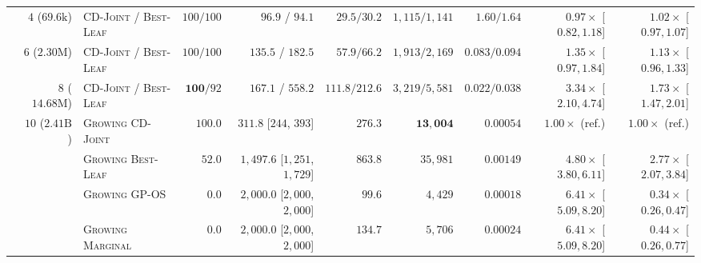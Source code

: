 \documentclass{article}
\theoremstyle{plain}
\theoremstyle{definition}
\begin{document}
\begin{table}[!htbp]
{\begin{tabular}{@{}lrlrrrrrrr@{}}
\midrule
{}
  & $4$ ($69.6\mathrm{k}$)   & \textsc{CD-Joint} / \textsc{Best-Leaf} & $100 / 100$         & $96.9$ / $94.1$            & $29.5 / 30.2$   & $1{,}115 / 1{,}141$  & $1.60 / 1.64$   & $0.97\times$ [$0.82, 1.18$] & $1.02\times$ [$0.97, 1.07$] \\
  & $6$ ($2.30\mathrm{M}$)   & \textsc{CD-Joint} / \textsc{Best-Leaf} & $100 / 100$         & $\mathbf{135.5}$ / $182.5$ & $57.9 / 66.2$   & $1{,}913 / 2{,}169$  & $0.083 / 0.094$ & $1.35\times$ [$0.97, 1.84$] & $1.13\times$ [$0.96, 1.33$] \\
  & $8$ ($14.68\mathrm{M}$)  & \textsc{CD-Joint} / \textsc{Best-Leaf} & $\mathbf{100} / 92$ & $\mathbf{167.1}$ / $558.2$ & $111.8 / 212.6$ & $3{,}219 / 5{,}581$  & $0.022 / 0.038$ & $\mathbf{3.34\times}$ [$2.10, 4.74$] & $\mathbf{1.73\times}$ [$1.47, 2.01$] \\
  & 
    & \textsc{Growing CD-Joint}  & $\mathbf{100.0}$ & $\mathbf{311.8}$ [$244$, $393$]    & $\mathbf{276.3}$ & $\mathbf{13{,}004}$ & $\mathbf{0.00054}$ & $1.00\times$ (ref.) & $1.00\times$ (ref.) \\
  & & \textsc{Growing Best-Leaf} & $52.0$           & $1{,}497.6$ [$1{,}251$, $1{,}729$] & $863.8$          & $35{,}981$          & $0.00149$          & $\mathbf{4.80\times}$ [$3.80, 6.11$] & $\mathbf{2.77\times}$ [$2.07, 3.84$] \\
  & & \textsc{Growing GP-OS}     & $0.0$            & $2{,}000.0$ [$2{,}000$, $2{,}000$] & $99.6$           & $4{,}429$           & $0.00018$          & $6.41\times$ [$5.09, 8.20$] & $0.34\times$ [$0.26, 0.47$] \\
  & & \textsc{Growing Marginal}  & $0.0$            & $2{,}000.0$ [$2{,}000$, $2{,}000$] & $134.7$          & $5{,}706$           & $0.00024$          & $6.41\times$ [$5.09, 8.20$] & $0.44\times$ [$0.26, 0.77$] \\
\bottomrule
\end{tabular}%
}
\end{table}
\end{document}
